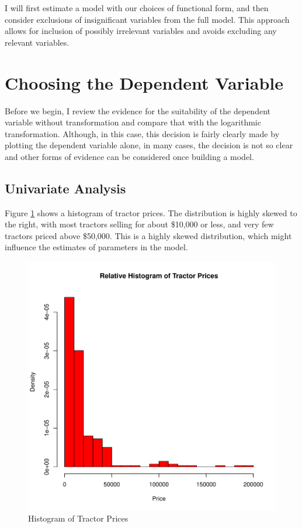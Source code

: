 \documentclass[11pt]{paper}
\begin{document}
I will first estimate a model with our choices of functional form, and then consider exclusions of insignificant variables from the full model. 
This approach allows for inclusion of possibly irrelevant variables and avoids excluding any relevant variables. 




\pagebreak
\section{Choosing the Dependent Variable}

Before we begin, I review the evidence for the suitability of the 
dependent variable without transformation
and compare that with the logarithmic transformation. 
Although, in this case, this decision is fairly clearly made by plotting the dependent variable alone, 
in many cases, the decision is not so clear and other forms
of evidence can be considered once building a model. 


\subsection{Univariate Analysis}

Figure \ref{fig:hist_price} shows  a histogram of tractor prices.
The distribution is highly skewed to the right, 
with most tractors selling for about \$10,000 or less,
and very few tractors priced above \$50,000.
This is a highly skewed distribution, which might influence the
estimates of parameters in the model. 


\begin{figure}[h!]
  \centering
  \includegraphics[scale = 0.5, keepaspectratio=true]{../Figures/hist_price}
  \caption{Histogram of Tractor Prices} \label{fig:hist_price}
\end{figure}
\end{document}
